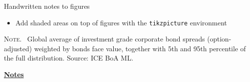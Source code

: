 \documentclass[10pt]{beamer}
\begin{document}
\begin{frame}[t]
    {Handwritten notes to figures}
    \begin{itemize}
        \item Add shaded areas on top of figures with the \texttt{tikzpicture} environment
    \end{itemize}
    \begin{center}
        \begin{minipage}[b]{.6\textwidth}
            \tiny{{\scshape Note}. \ Global average of investment grade corporate bond spreads (option-adjusted) weighted by bonds face value, together with 5th and 95th percentile of the full distribution. Source: ICE BoA ML.} 
        \end{minipage}
    \end{center}
\end{frame}	
\begin{flushleft}
    \underline{\textbf{Notes}}\setlength{\parskip}{.15cm}\notesize\newline\par
\end{flushleft}
\end{document}
